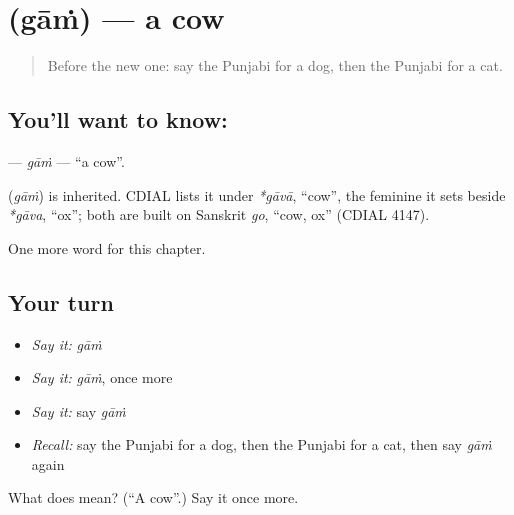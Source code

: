 \section[\texorpdfstring{\pa{ਗਾਂ} (gāṁ)}{ਗਾਂ (gāṁ)}]{ (gāṁ) — a cow}

\label{lesson:PA-C77-gam}



\begin{quote}
Before the new one: say the Punjabi for a dog, then the Punjabi for a cat.
\end{quote}

\subsection*{You'll want to know: }
\textbf{} — \emph{gāṁ} — \textquotedblleft{}a cow\textquotedblright{}.

\begin{cousinweb}
\textbf{} (\emph{gāṁ}) is inherited. CDIAL lists it under \emph{*gāvā}, \textquotedblleft{}cow\textquotedblright{}, the feminine it sets beside \emph{*gāva}, \textquotedblleft{}ox\textquotedblright{}; both are built on Sanskrit \emph{go}, \textquotedblleft{}cow, ox\textquotedblright{} (CDIAL 4147).
\end{cousinweb}

\begin{grammarlens}[title={What you've built}]
One more word for this chapter.
\end{grammarlens}

\subsection*{Your turn}
\begin{itemize}
\raggedright
  \item \emph{Say it:} \emph{gāṁ}
  \item \emph{Say it:} \emph{gāṁ}, once more
  \item \emph{Say it:} say \emph{gāṁ}
  \item \emph{Recall:} say the Punjabi for a dog, then the Punjabi for a cat, then say \emph{gāṁ} again
\end{itemize}

\begin{tcolorbox}[breakable,colback=teal!4,colframe=teal!35!black,title={Before you move on}]
What does  mean? (\textquotedblleft{}A cow\textquotedblright{}.) Say it once more.
\end{tcolorbox}
